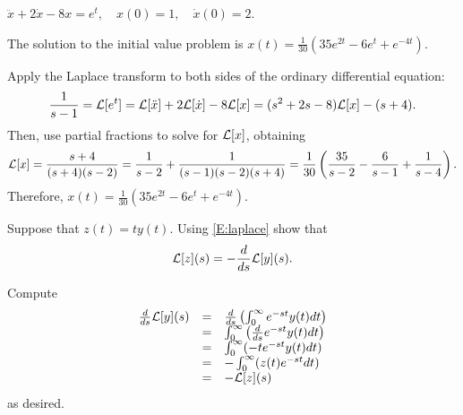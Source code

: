 \documentclass{ximera}
\begin{document}
\begin{exercise} \label{c13.2.2}
$\ddot{x} + 2\dot{x} - 8x = e^t, \quad x(0) = 1, \quad \dot{x}(0) = 2$.

\begin{solution}
\ans The solution to the initial value problem is
$x(t) = \frac{1}{30}(35e^{2t}-6e^t+e^{-4t})$.

\soln Apply the Laplace transform to both sides of the ordinary
differential equation:
\[
\frac{1}{s-1} = {\cal L}[e^t]
= {\cal L}[\ddot{x}] + 2{\cal L}[\dot{x}] - 8{\cal L}[x]
= (s^2 + 2s - 8){\cal L}[x] - (s + 4).
\]
Then, use partial fractions to solve for ${\cal L}[x]$, obtaining
\[
{\cal L}[x] = \frac{s+4}{(s + 4)(s - 2)}
= \frac{1}{s-2} + \frac{1}{(s-1)(s-2)(s+4)}
= \frac{1}{30}\left(\frac{35}{s-2} - \frac{6}{s-1} + \frac{1}{s-4}\right).
\]
Therefore, $x(t)=\frac{1}{30}(35e^{2t}-6e^t+e^{-4t})$.


\end{solution}
\end{exercise}

\begin{exercise} \label{c13.1.2}
Suppose that $z(t)=ty(t)$.  Using \eqref{E:laplace} show that
\[
{\cal L}[z](s) = -\frac{\displaystyle d}{\displaystyle ds} {\cal L}[y](s).
\]

\begin{solution}
Compute
\[
\begin{array}{rcl}
\frac{d}{ds}{\cal L}[y](s)
& = & \frac{d}{ds}\left(\int_0^\infty e^{-st}y(t)dt\right) \\
& = & \int_0^\infty\left(\frac{d}{ds} e^{-st}y(t)dt\right) \\
& = & \int_0^\infty (-te^{-st}y(t)dt) \\
& = & -\int_0^\infty (z(t)e^{-st}dt) \\
& = & -{\cal L}[z](s)
\end{array}
\]
as desired.





\end{solution}
\end{exercise}
\end{document}

